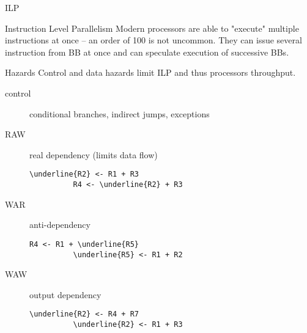 \documentclass[8pt]{beamer}
\begin{document}
\begin{frame}[fragile]{ILP}
  \begin{block}{Instruction Level Parallelism}
    Modern processors are able to "execute" multiple instructions at once -- an
    order of 100 is not uncommon. They can issue several instruction from BB at
    once and can speculate execution of successive BBs.
  \end{block}

  \begin{block}{Hazards}
    Control and data hazards limit ILP and thus processors throughput.
    \begin{description}
      \item[control] conditional branches, indirect jumps, exceptions
      \item[RAW] real dependency (limits data flow)
        \begin{Verbatim}[commandchars=\\\{\}]
          \underline{R2} <- R1 + R3
          R4 <- \underline{R2} + R3
        \end{Verbatim}
      \item[WAR] anti-dependency
        \begin{Verbatim}[commandchars=\\\{\}]
          R4 <- R1 + \underline{R5}
          \underline{R5} <- R1 + R2
        \end{Verbatim}
      \item[WAW] output dependency
        \begin{Verbatim}[commandchars=\\\{\}]
          \underline{R2} <- R4 + R7
          \underline{R2} <- R1 + R3
        \end{Verbatim}
    \end{description}
  \end{block}
\end{frame}
\end{document}
